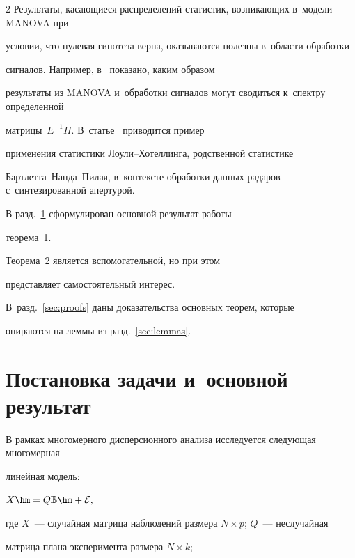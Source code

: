 \begin{multicols}{2}
Результаты, касающиеся распределений статистик, возникающих в~модели MANOVA при 


условии, что нулевая гипотеза верна, оказываются полезны в~области обработки 


сигналов. \mbox{Например}, в~\cite{lit:Johnstone_RoyStat} показано, каким образом 


результаты из MANOVA и~обработки сигналов могут сводиться к~спектру определенной 


матрицы~$E^{-1}H$. В~\mbox{статье}~\cite{lit:Akbari_AppliedLH} приводится пример 


применения статистики Лоу\-ли--Хо\-тел\-лин\-га, родственной статистике 


Барт\-лет\-та--Нан\-да--Пи\-лая, в~контексте обработки данных радаров с~синтезированной апертурой.





В разд.~\ref{sec:results} сформулирован основной результат работы~--- 


теорема~1.


Теорема~2 является   вспомогательной, но при этом 


представляет самостоятельный интерес.


В~разд.~\ref{sec:proofs} даны доказательства основных теорем, которые 


опираются на леммы из разд.~\ref{sec:lemmas}.







\section{Постановка задачи и~основной результат}


\label{sec:results}








В рамках многомерного дисперсионного анализа исследуется следующая многомерная 


линейная модель:


$


X\hm=Q\mathbb{B}\hm+\mathcal{E},


$


где $X$~--- случайная матрица наблюдений размера $N \times p$; $Q$~--- неслучайная 


матрица плана эксперимента размера $N \times k$;



\end{multicols}
